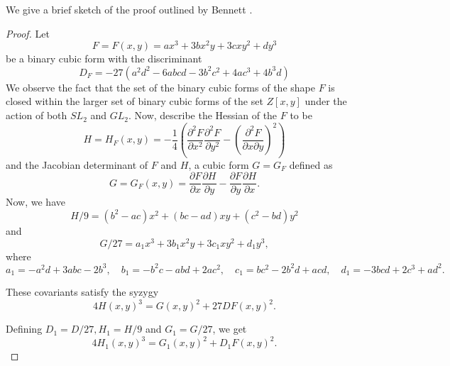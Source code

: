 \documentclass[12pt]{amsart}
\theoremstyle{plain}
\theoremstyle{definition}
\theoremstyle{remark}
\numberwithin{equation}{section}
\numberwithin{thm}{section}
\theoremstyle{named}
\theoremstyle{named}
\begin{document}
We give a brief sketch of the proof outlined by {Bennett} \cite{Bennett_2015}. %
\begin{proof}
    

 Let \begin{equation*}F = F(x,y) = ax^3 + 3bx^2y + 3cxy^2 + dy^3 \end{equation*} be a binary cubic form with the discriminant \begin{equation*} D_{F} = -27(a^2d^2 - 6abcd -  3b^2c^2 + 4ac^3 + 4b^3d) \end{equation*} We observe the fact that the set of the binary cubic forms of the shape $F$ is closed within the larger set of binary cubic forms of the set $Z[x,y]$ under the action of both $SL_{2}$ and $GL_{2}$. Now, describe the Hessian of the $F$ to be
\begin{equation*}
H=H_F(x, y)=-\frac{1}{4}\left(\frac{\partial^2 F}{\partial x^2} \frac{\partial^2 F}{\partial y^2}-\left(\frac{\partial^2 F}{\partial x \partial y}\right)^2\right)
\end{equation*}
and the Jacobian determinant of $F$ and $H$, a cubic form $G=G_F$ defined as
\begin{equation*}
G=G_F(x, y)=\frac{\partial F}{\partial x} \frac{\partial H}{\partial y}-\frac{\partial F}{\partial y} \frac{\partial H}{\partial x} .
\end{equation*} Now, we have 
\begin{equation*}
H / 9=\left(b^2-a c\right) x^2+(b c-a d) x y+\left(c^2-b d\right) y^2
\end{equation*}
and 
\begin{equation*}
G / 27=a_1 x^3+3 b_1 x^2 y+3 c_1 x y^2+d_1 y^3,
\end{equation*}
where
\begin{equation*}
a_1=-a^2 d+3 a b c-2 b^3, \quad b_1=-b^2 c-a b d+2 a c^2, \quad c_1=b c^2-2 b^2 d+a c d, \quad d_1=-3bcd+2c^3+ad^2.
\end{equation*}

These covariants satisfy the syzygy 
\begin{equation*}
4 H(x, y)^3=G(x, y)^2+27 D F(x, y)^2 .
\end{equation*}

Defining $D_1=D / 27, H_1=H / 9$ and $G_1=G / 27$, we get
\begin{equation*}
4 H_1(x, y)^3=G_1(x, y)^2+D_1 F(x, y)^2 .
\end{equation*}


\end{proof}
\end{document}
